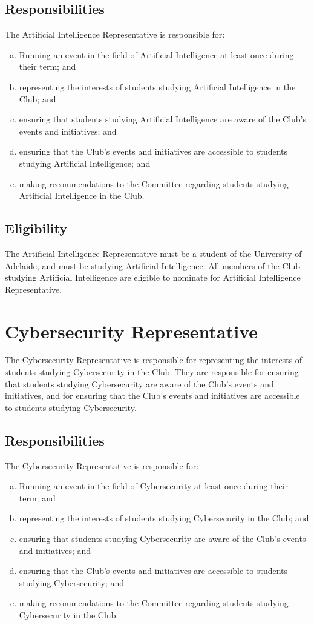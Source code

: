 \documentclass[11pt]{report}
\begin{document}
\subsection{Responsibilities}
The Artificial Intelligence Representative is responsible for:
\begin{enumerate}[(a)]
    \item Running an event in the field of Artificial Intelligence at least once during their term; and
    \item representing the interests of students studying Artificial Intelligence in the Club; and
    \item ensuring that students studying Artificial Intelligence are aware of the Club's events and initiatives; and
    \item ensuring that the Club's events and initiatives are accessible to students studying Artificial Intelligence; and
    \item making recommendations to the Committee regarding students studying Artificial Intelligence in the Club.
\end{enumerate}
\subsection{Eligibility}
The Artificial Intelligence Representative must be a student of the University of Adelaide, and must be studying Artificial Intelligence. All members of the Club studying Artificial Intelligence are eligible to nominate for Artificial Intelligence Representative.

\section{Cybersecurity Representative}
The Cybersecurity Representative is responsible for representing the interests of students studying Cybersecurity in the Club. They are responsible for ensuring that students studying Cybersecurity are aware of the Club's events and initiatives, and for ensuring that the Club's events and initiatives are accessible to students studying Cybersecurity.
\subsection{Responsibilities}
The Cybersecurity Representative is responsible for:
\begin{enumerate}[(a)]
    \item Running an event in the field of Cybersecurity at least once during their term; and
    \item representing the interests of students studying Cybersecurity in the Club; and
    \item ensuring that students studying Cybersecurity are aware of the Club's events and initiatives; and
    \item ensuring that the Club's events and initiatives are accessible to students studying Cybersecurity; and
    \item making recommendations to the Committee regarding students studying Cybersecurity in the Club.
\end{enumerate}
\end{document}
